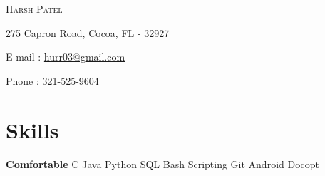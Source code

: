 \documentclass{my_resume_class}
\newcommand{\name}[1]{
   \centerline{\textsc{\huge{#1}}}
}
\newcommand{\contact}[1]{
   \centerline{\normalsize{#1}}
}
\begin{document}
\name{Harsh Patel}
\vspace{0.1cm}
\contact{275 Capron Road, Cocoa, FL - 32927}
\vspace{0.05cm}
\contact{E-mail : \href{mailto:hurr03@gmail.com}{hurr03@gmail.com}}
\vspace{0.05cm}
\contact{Phone : 321-525-9604 }

\section{Skills}
{\textbf{Comfortable}  \hspace{0.80cm} C\hspace{0.50cm} Java\hspace{0.50cm} Python\hspace{0.50cm} SQL\hspace{0.50cm} Bash Scripting\hspace{0.50cm} Git\hspace{0.50cm} Android\hspace{0.50cm} Docopt } \\
\end{document}
